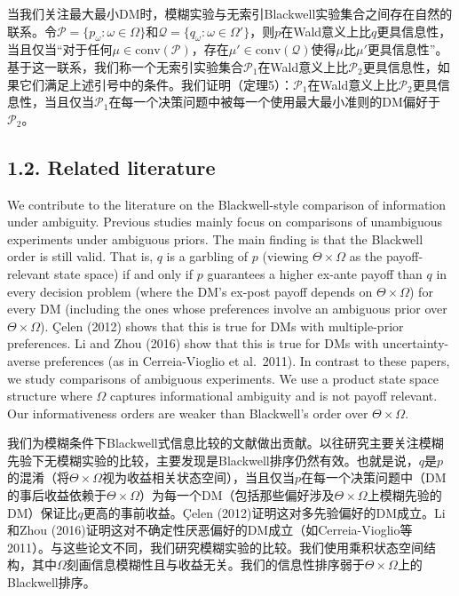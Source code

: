 \documentclass[12pt,a4paper]{article}
\newenvironment{original}
  {\par\vspace{4pt}\noindent\color{black}\ignorespaces}
  {\par\vspace{2pt}}
\newenvironment{translation}
  {\par\vspace{2pt}\noindent\color{myblue}\ignorespaces}
  {\par\vspace{6pt}}
\newcommand{\bisubsection}[2]{%
  \subsection{#1}%
  \vspace{-2pt}%
  \noindent{\color{myblue}\bfseries #2}%
  \vspace{4pt}%
}
\newcommand{\conv}{\mathrm{conv}}
\begin{document}
\begin{translation}
当我们关注最大最小DM时，模糊实验与无索引Blackwell实验集合之间存在自然的联系。令$\mathcal{P}=\{p_{\omega}:\omega\in\Omega\}$和$\mathcal{Q}=\{q_{\omega}:\omega\in\Omega'\}$，则$p$在Wald意义上比$q$更具信息性，当且仅当``对于任何$\mu\in\conv(\mathcal{P})$，存在$\mu'\in\conv(\mathcal{Q})$使得$\mu$比$\mu'$更具信息性''。基于这一联系，我们称一个无索引实验集合$\mathcal{P}_1$在Wald意义上比$\mathcal{P}_2$更具信息性，如果它们满足上述引号中的条件。我们证明（定理5）：$\mathcal{P}_1$在Wald意义上比$\mathcal{P}_2$更具信息性，当且仅当$\mathcal{P}_1$在每一个决策问题中被每一个使用最大最小准则的DM偏好于$\mathcal{P}_2$。
\end{translation}


\bisubsection{1.2. Related literature}{1.2. 相关文献}

\begin{original}
We contribute to the literature on the Blackwell-style comparison of information under ambiguity. Previous studies mainly focus on comparisons of unambiguous experiments under ambiguous priors. The main finding is that the Blackwell order is still valid. That is, $q$ is a garbling of $p$ (viewing $\Theta\times\Omega$ as the payoff-relevant state space) if and only if $p$ guarantees a higher ex-ante payoff than $q$ in every decision problem (where the DM's ex-post payoff depends on $\Theta\times\Omega$) for every DM (including the ones whose preferences involve an ambiguous prior over $\Theta\times\Omega$). \c{C}elen (2012) shows that this is true for DMs with multiple-prior preferences. Li and Zhou (2016) show that this is true for DMs with uncertainty-averse preferences (as in Cerreia-Vioglio et al.\ 2011). In contrast to these papers, we study comparisons of ambiguous experiments. We use a product state space structure where $\Omega$ captures informational ambiguity and is not payoff relevant. Our informativeness orders are weaker than Blackwell's order over $\Theta\times\Omega$.
\end{original}

\begin{translation}
我们为模糊条件下Blackwell式信息比较的文献做出贡献。以往研究主要关注模糊先验下无模糊实验的比较，主要发现是Blackwell排序仍然有效。也就是说，$q$是$p$的混淆（将$\Theta\times\Omega$视为收益相关状态空间），当且仅当$p$在每一个决策问题中（DM的事后收益依赖于$\Theta\times\Omega$）为每一个DM（包括那些偏好涉及$\Theta\times\Omega$上模糊先验的DM）保证比$q$更高的事前收益。\c{C}elen (2012)证明这对多先验偏好的DM成立。Li和Zhou (2016)证明这对不确定性厌恶偏好的DM成立（如Cerreia-Vioglio等 2011）。与这些论文不同，我们研究模糊实验的比较。我们使用乘积状态空间结构，其中$\Omega$刻画信息模糊性且与收益无关。我们的信息性排序弱于$\Theta\times\Omega$上的Blackwell排序。
\end{translation}
\end{document}
